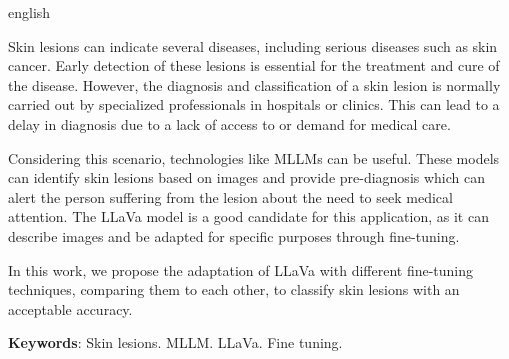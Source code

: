 \begin{resumo}[Abstract]
	\SingleSpacing
	\begin{otherlanguage*}{english}

		Skin lesions can indicate several diseases, including serious diseases such as skin cancer. Early detection of these lesions is essential for the treatment
		and cure of the disease. However, the diagnosis and classification of a skin lesion is normally carried out by specialized professionals in hospitals or clinics.
		This can lead to a delay in diagnosis due to a lack of access to or demand for medical care.

		Considering this scenario, technologies like \ac{MLLMs} can be useful. These models can identify skin lesions based on images and provide pre-diagnosis which
		can alert the person suffering from the lesion about the need to seek medical attention. The \ac{LLaVa} model  is a good candidate for this application, as it can
		describe images and be adapted for specific purposes through fine-tuning.

		In this work, we propose the adaptation of \ac{LLaVa} with different fine-tuning techniques, comparing them to each other, to classify skin lesions with an
		acceptable accuracy.

		\textbf{Keywords}: Skin lesions. MLLM. LLaVa. Fine tuning.
	\end{otherlanguage*}
\end{resumo}

{
\hypersetup{hidelinks}

\imprimirlistadesiglas

\tableofcontents*
\cleardoublepage
}
